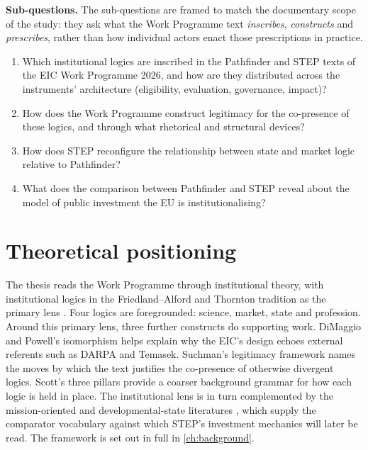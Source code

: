 \medskip
\noindent\textbf{Sub-questions.} The sub-questions are framed to match
the documentary scope of the study: they ask what the Work Programme
text \emph{inscribes}, \emph{constructs} and \emph{prescribes}, rather
than how individual actors enact those prescriptions in practice.
\begin{enumerate}[label=\textbf{SQ\arabic*.},leftmargin=*]
    \item Which institutional logics are inscribed in the Pathfinder and
          STEP texts of the EIC Work Programme 2026, and how are they
          distributed across the instruments' architecture
          (eligibility, evaluation, governance, impact)?
    \item How does the Work Programme construct legitimacy for the
          co-presence of these logics, and through what rhetorical and
          structural devices?
    \item How does STEP reconfigure the relationship between state and
          market logic relative to Pathfinder?
    \item What does the comparison between Pathfinder and STEP reveal
          about the model of public investment the EU is
          institutionalising?
\end{enumerate}

\section{Theoretical positioning}
\label{sec:intro-theory}
The thesis reads the Work Programme through institutional theory, with
institutional logics in the Friedland--Alford and Thornton tradition
as the primary lens \parencite{friedland1991bringing,
thornton2012institutional}. Four logics are foregrounded: science,
market, state and profession. Around this primary lens, three further
constructs do supporting work. DiMaggio and Powell's isomorphism
\parencite{dimaggio1983iron} helps explain why the EIC's design echoes
external referents such as DARPA and Temasek. Suchman's legitimacy
framework names the moves by which the text justifies the co-presence
of otherwise divergent logics. Scott's three pillars
\parencite{scott2014institutions} provide a coarser background grammar
for how each logic is held in place. The institutional lens is in turn
complemented by the mission-oriented and developmental-state
literatures \parencite{mazzucato2013entrepreneurial}, which supply the
comparator vocabulary against which STEP's investment mechanics will
later be read. The framework is set out in full in \cref{ch:background}.


